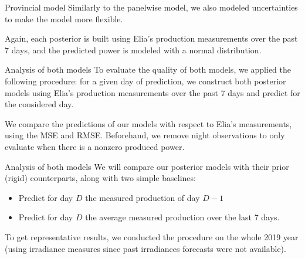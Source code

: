 \documentclass[12pt]{beamer}
\begin{document}
\begin{frame}{Provincial model}
    Similarly to the panelwise model, we also modeled \alert{uncertainties} to make the model more flexible.
    
    Again, each \alert{posterior} is built using Elia's production measurements over the past 7 days, and the predicted power is modeled with a normal distribution.
\end{frame}

\begin{frame}{Analysis of both models}
    To evaluate the quality of both models, we applied the following \alert{procedure}: for a given day of prediction, we construct both posterior models using Elia's production measurements over the past 7 days and predict for the considered day.
    
    We \alert{compare} the predictions of our models with respect to Elia's measurements, using the MSE and RMSE. Beforehand, we \alert{remove} night observations to only evaluate when there is a nonzero produced power.
\end{frame}

\begin{frame}{Analysis of both models}
    We will compare our posterior models with their prior (rigid) counterparts, along with two simple \alert{baselines}:
    \begin{itemize}
        \item Predict for day $D$ the measured production of day $D - 1$
        \item Predict for day $D$ the average measured production over the last 7 days.
    \end{itemize}
    
    To get \alert{representative} results, we conducted the procedure on the whole 2019 year (using irradiance measures since past irradiances forecasts were not available). 
\end{frame}
\end{document}
